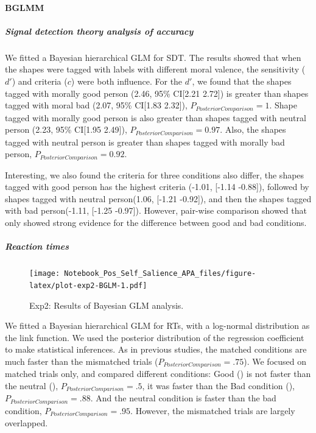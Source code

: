 \documentclass[
  english,
  man]{apa6}
\let\oldparagraph\paragraph
\renewcommand{\paragraph}[1]{\oldparagraph{#1}\mbox{}}
\let\oldsubparagraph\subparagraph
\renewcommand{\subparagraph}[1]{\oldsubparagraph{#1}\mbox{}}
\begin{document}
\hypertarget{bglmm}{%
\paragraph{BGLMM}\label{bglmm}}

\hypertarget{signal-detection-theory-analysis-of-accuracy-2}{%
\subparagraph{Signal detection theory analysis of accuracy}\label{signal-detection-theory-analysis-of-accuracy-2}}

We fitted a Bayesian hierarchical GLM for SDT. The results showed that when the shapes were tagged with labels with different moral valence, the sensitivity (\(d'\)) and criteria (\(c\)) were both influence. For the \(d'\), we found that the shapes tagged with morally good person (2.46, 95\% CI{[}2.21 2.72{]}) is greater than shapes tagged with moral bad (2.07, 95\% CI{[}1.83 2.32{]}), \(P_{PosteriorComparison} = 1\). Shape tagged with morally good person is also greater than shapes tagged with neutral person (2.23, 95\% CI{[}1.95 2.49{]}), \(P_{PosteriorComparison} = 0.97\). Also, the shapes tagged with neutral person is greater than shapes tagged with morally bad person, \(P_{PosteriorComparison} = 0.92\).

Interesting, we also found the criteria for three conditions also differ, the shapes tagged with good person has the highest criteria (-1.01, {[}-1.14 -0.88{]}), followed by shapes tagged with neutral person(1.06, {[}-1.21 -0.92{]}), and then the shapes tagged with bad person(-1.11, {[}-1.25 -0.97{]}). However, pair-wise comparison showed that only showed strong evidence for the difference between good and bad conditions.

\hypertarget{reaction-times-3}{%
\subparagraph{Reaction times}\label{reaction-times-3}}

\begin{figure}
\centering
\texttt{[image: Notebook\_Pos\_Self\_Salience\_APA\_files/figure-latex/plot-exp2-BGLM-1.pdf]}
\caption{\label{fig:plot-exp2-BGLM}Exp2: Results of Bayesian GLM analysis.}
\end{figure}

We fitted a Bayesian hierarchical GLM for RTs, with a log-normal distribution as the link function. We used the posterior distribution of the regression coefficient to make statistical inferences. As in previous studies, the matched conditions are much faster than the mismatched trials (\(P_{PosteriorComparison} = .75\)). We focused on matched trials only, and compared different conditions: Good () is not faster than the neutral (), \(P_{PosteriorComparison} = .5\), it was faster than the Bad condition (), \(P_{PosteriorComparison} = .88\). And the neutral condition is faster than the bad condition, \(P_{PosteriorComparison} = .95\). However, the mismatched trials are largely overlapped.
\end{document}
